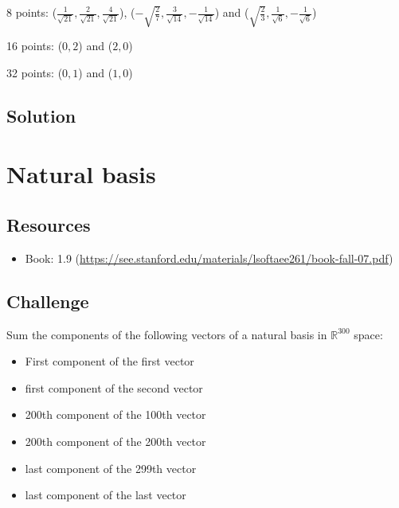 8 points:
($\displaystyle \frac{1}{\sqrt{21}}, \frac{2}{\sqrt{21}}, \frac{4}{\sqrt{21}}$),
($\displaystyle -\sqrt{\frac{2}{7}}, \frac{3}{\sqrt{14}}, -\frac{1}{\sqrt{14}}$) and
($\displaystyle \sqrt{\frac{2}{3}},  \frac{1}{\sqrt{6}}, -\frac{1}{\sqrt{6}}$)


16 points:
($0, 2$) and ($2, 0$)

32 points:
($0, 1$) and ($1, 0$)

\subsection*{Solution}




\newpage
\section{Natural basis}

\subsection*{Resources}
\begin{itemize}
    \item Book: 1.9 (\url{https://see.stanford.edu/materials/lsoftaee261/book-fall-07.pdf})
\end{itemize}

\subsection*{Challenge}
Sum the components of the following vectors of a natural basis in $\mathbb{R}^{300}$ space:

\begin{itemize}
    \item First component of the first vector
    \item first component of the second vector
    \item 200th component of the 100th vector
    \item 200th component of the 200th vector
    \item last component of the 299th vector
    \item last component of the last vector
\end{itemize}

